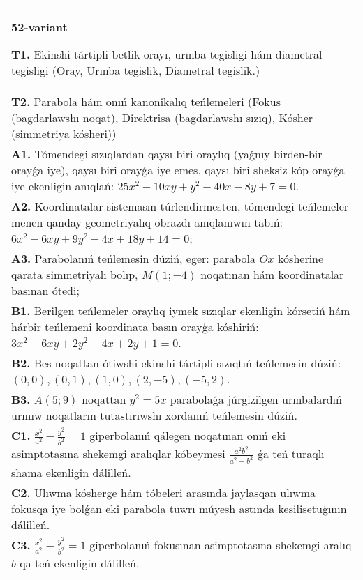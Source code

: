 \documentclass{article}
\begin{document}
\begin{tabular}{m{17cm}}
\textbf{52-variant}
\newline

\textbf{T1.} Ekinshi tártipli betlik orayı, urınba tegisligi hám diametral tegisligi (Oray, Urınba tegislik, Diametral tegislik.) \\
\textbf{T2.} Parabola hám onıń kanonikalıq teńlemeleri (Fokus (bagdarlawshı noqat), Direktrisa (bagdarlawshı sızıq), Kósher (simmetriya kósheri)) \\
\textbf{A1.} Tómendegi sızıqlardan qaysı biri oraylıq (yaǵnıy birden-bir orayǵa iye), qaysı biri orayǵa iye emes, qaysı biri sheksiz kóp orayǵa iye ekenligin anıqlań: $25 x^2-10 x y+y^2+40 x-8 y+7=0$. \\
\textbf{A2.} Koordinatalar sistemasın túrlendirmesten, tómendegi teńlemeler menen qanday geometriyalıq obrazdı anıqlanıwın tabıń: $6 x^2-6 x y+9 y^2-4 x+18 y+14=0$; \\
\textbf{A3.} Parabolanıń teńlemesin dúziń, eger: parabola $O x$ kósherine qarata simmetriyalı bolıp, $M (1;-4) $ noqatınan hám koordinatalar basınan ótedi; \\
\textbf{B1.} Berilgen teńlemeler oraylıq iymek sızıqlar ekenligin kórsetiń hám hárbir teńlemeni koordinata basın orayģa kóshiriń: $3x^2-6xy+2y^2-4x+2y+1=0$. \\
\textbf{B2.} Bes noqattan ótiwshi ekinshi tártipli sızıqtıń teńlemesin dúziń: $(0,0),(0,1),(1,0),(2,-5),(-5,2)$. \\
\textbf{B3.} $A (5;9) $ noqattan $y^2=5x$ parabolaǵa júrgizilgen urınbalardıń urınıw noqatların tutastırıwshı xordanıń teńlemesin dúziń. \\
\textbf{C1.} $\frac{x^2}{a^2}-\frac{y^2}{b^2}=1$ giperbolanıń qálegen noqatınan onıń eki asimptotasına shekemgi aralıqlar kóbeymesi $\frac{a^2 b^2}{a^2+b^2}$ ǵa teń turaqlı shama ekenligin dálilleń. \\
\textbf{C2.} Ulıwma kósherge hám tóbeleri arasında jaylasqan ulıwma fokusqa iye bolǵan eki parabola tuwrı múyesh astında kesilisetuģının dálilleń. \\
\textbf{C3.} $\frac{x^2}{a^2}-\frac{y^2}{b^2}=1$ giperbolanıń fokusınan asimptotasına shekemgi aralıq $b$ qa teń ekenligin dálilleń. \\

\end{tabular}
\vspace{1cm}
\end{document}
